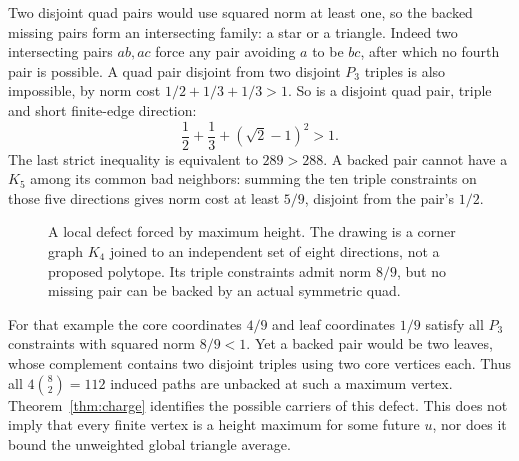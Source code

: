 \documentclass[11pt]{article}
\theoremstyle{definition}\newtheorem{definition}[theorem]{Definition}
\theoremstyle{remark}\newtheorem{remark}[theorem]{Remark}
\newcommand{\Pthree}{P_3}
\newcommand{\bin}[2]{\binom{#1}{#2}}
\begin{document}
Two disjoint quad pairs would use squared norm at least one, so
the backed missing pairs form an intersecting family: a star or a
triangle. Indeed two intersecting pairs \(ab,ac\) force any pair
avoiding \(a\) to be \(bc\), after which no fourth pair is possible.
A quad pair disjoint from two disjoint \(\Pthree\) triples is
also impossible, by norm cost \(1/2+1/3+1/3>1\). So is a
disjoint quad pair, triple and short finite-edge direction:
\[
 \frac12+\frac13+(\sqrt2-1)^2>1.
\]
The last strict inequality is equivalent to \(289>288\).
A backed pair cannot have a \(K_5\) among its common bad neighbors:
summing the ten triple constraints on those five directions gives
norm cost at least \(5/9\), disjoint from the pair's \(1/2\).

\begin{figure}[ht]
\centering
{}
\caption{A local defect forced by maximum height. The drawing is a
corner graph \(K_4\) joined to an independent set of eight directions,
not a proposed polytope. Its triple constraints admit norm \(8/9\),
but no missing pair can be backed by an actual symmetric quad.}
\end{figure}

For that example the core coordinates \(4/9\) and leaf coordinates
\(1/9\) satisfy all \(\Pthree\) constraints with squared norm
\(8/9<1\). Yet a backed pair would be two leaves, whose complement
contains two disjoint triples using two core vertices each.
Thus all \(4\bin82=112\) induced paths are unbacked at such a
maximum vertex. Theorem~\ref{thm:charge} identifies the possible
carriers of this defect. This does not imply that every finite vertex
is a height maximum for some future \(u\), nor does it bound the
unweighted global triangle average.
\end{document}
